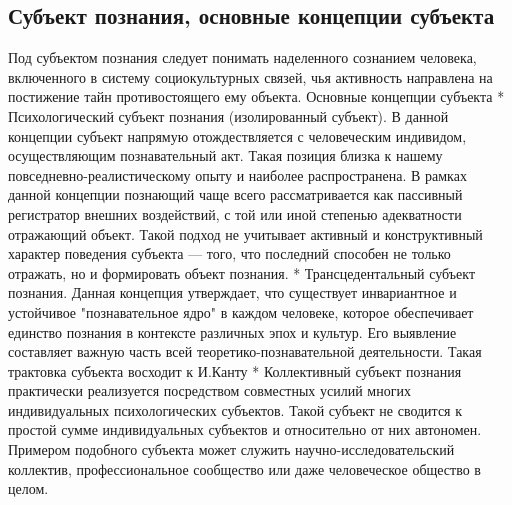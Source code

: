 \documentclass[12pt]{article}
\begin{document}
\subsection{Субъект познания, основные концепции субъекта}
Под  субъектом  познания  следует  понимать  наделенного  сознанием  человека,  включенного  в  систему
социокультурных связей, чья активность направлена на постижение тайн противостоящего ему объекта. 
Основные концепции субъекта
   * Психологический субъект познания (изолированный субъект). В данной концепции субъект напрямую
отождествляется с человеческим индивидом, осуществляющим познавательный акт. Такая позиция близка к
нашему  повседневно-реалистическому  опыту  и  наиболее  распространена.  В  рамках  данной  концепции
познающий чаще всего рассматривается как пассивный регистратор внешних воздействий, с той или иной
степенью адекватности отражающий объект. Такой подход не учитывает активный и конструктивный характер
поведения субъекта — того, что последний способен не только отражать, но и формировать объект познания.
   * Трансцедентальный субъект познания. Данная концепция утверждает, что существует инвариантное и
устойчивое "познавательное ядро" в каждом человеке, которое обеспечивает единство познания в контексте
различных  эпох  и  культур.  Его  выявление  составляет  важную  часть  всей  теоретико-познавательной
деятельности. Такая трактовка субъекта восходит к И.Канту
    *  Коллективный  субъект  познания  практически  реализуется  посредством  совместных  усилий  многих
индивидуальных психологических субъектов. Такой субъект не сводится к простой сумме индивидуальных
субъектов  и  относительно  от  них  автономен.  Примером  подобного  субъекта  может  служить  научно-исследовательский коллектив, профессиональное сообщество или даже человеческое общество в целом.
\end{document}
